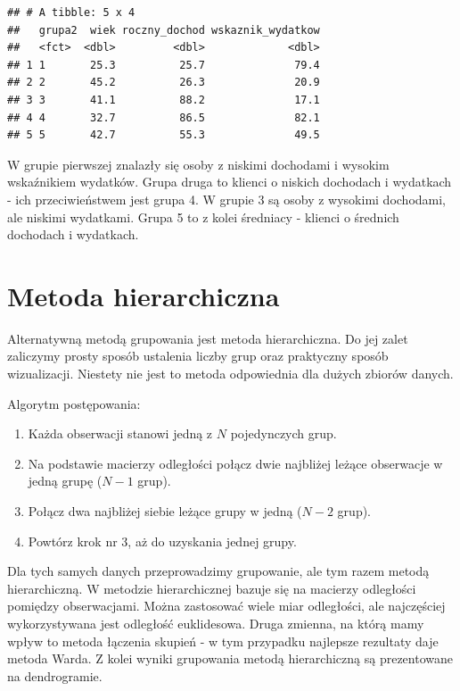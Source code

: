 \documentclass[]{book}
\providecommand{\tightlist}{%
  \setlength{\itemsep}{0pt}\setlength{\parskip}{0pt}}
\begin{document}
\begin{verbatim}
## # A tibble: 5 x 4
##   grupa2  wiek roczny_dochod wskaznik_wydatkow
##   <fct>  <dbl>         <dbl>             <dbl>
## 1 1       25.3          25.7              79.4
## 2 2       45.2          26.3              20.9
## 3 3       41.1          88.2              17.1
## 4 4       32.7          86.5              82.1
## 5 5       42.7          55.3              49.5
\end{verbatim}

W grupie pierwszej znalazły się osoby z niskimi dochodami i wysokim wskaźnikiem wydatków. Grupa druga to klienci o niskich dochodach i wydatkach - ich przeciwieństwem jest grupa 4. W grupie 3 są osoby z wysokimi dochodami, ale niskimi wydatkami. Grupa 5 to z kolei średniacy - klienci o średnich dochodach i wydatkach.

\hypertarget{metoda-hierarchiczna}{%
\section{Metoda hierarchiczna}\label{metoda-hierarchiczna}}

Alternatywną metodą grupowania jest metoda hierarchiczna. Do jej zalet zaliczymy prosty sposób ustalenia liczby grup oraz praktyczny sposób wizualizacji. Niestety nie jest to metoda odpowiednia dla dużych zbiorów danych.

Algorytm postępowania:

\begin{enumerate}
\def\labelenumi{\arabic{enumi}.}
\tightlist
\item
  Każda obserwacji stanowi jedną z \(N\) pojedynczych grup.
\item
  Na podstawie macierzy odległości połącz dwie najbliżej leżące obserwacje w jedną grupę (\(N-1\) grup).
\item
  Połącz dwa najbliżej siebie leżące grupy w jedną (\(N-2\) grup).
\item
  Powtórz krok nr 3, aż do uzyskania jednej grupy.
\end{enumerate}

Dla tych samych danych przeprowadzimy grupowanie, ale tym razem metodą hierarchiczną. W metodzie hierarchicznej bazuje się na macierzy odległości pomiędzy obserwacjami. Można zastosować wiele miar odległości, ale najczęściej wykorzystywana jest odległość euklidesowa. Druga zmienna, na którą mamy wpływ to metoda łączenia skupień - w tym przypadku najlepsze rezultaty daje metoda Warda. Z kolei wyniki grupowania metodą hierarchiczną są prezentowane na dendrogramie.
\end{document}
